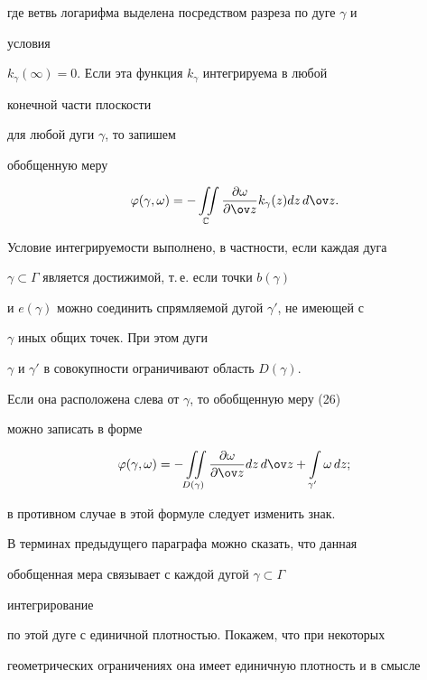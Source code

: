 где ветвь логарифма выделена посредством разреза по дуге $\gamma$ и 


условия 


$k_\gamma(\infty)=0$. Если эта функция $k_\gamma$ интегрируема в любой 


конечной части плоскости 


для любой дуги $\gamma$, то запишем 


обобщенную меру 


\begin{equation} 


\varphi(\gamma,\omega)=-\iint\limits_{\Bbb C} 


\myfrac{\omega}{\ov z}k_\gamma(z)dz\,d\ov z. 


\end{equation} 


Условие интегрируемости выполнено, в частности, если каждая дуга 


$\gamma\subset\Gamma$ является достижимой, т.\,е. если точки $b(\gamma)$ 


и $e(\gamma)$ можно соединить спрямляемой дугой $\gamma'$, не имеющей с 


$\gamma$ иных общих точек. При этом дуги 


$\gamma$ и $\gamma'$ в совокупности ограничивают область $D(\gamma)$. 


Если она расположена слева от $\gamma$, то обобщенную меру (26) 


можно записать в форме 


\begin{equation} 


\varphi(\gamma,\omega)=-\iint\limits_{D(\gamma)} 


\myfrac{\omega}{\ov z}dz\,d\ov z+\intl_{\gamma'}\omega\,dz;


\end{equation} 


в противном случае в этой формуле следует изменить знак. 


 


В терминах предыдущего параграфа можно сказать, что данная 


обобщенная мера связывает с каждой дугой $\gamma\subset\Gamma$ 


интегрирование 


по этой дуге с единичной плотностью. Покажем, что при некоторых  


геометрических ограничениях она имеет единичную плотность и в смысле 


